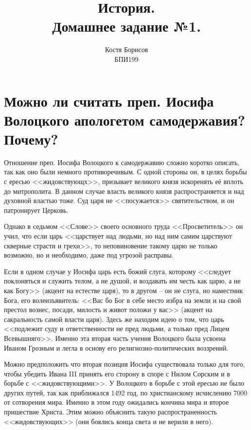 \documentclass[12pt]{article}
\title{История. \\ Домашнее задание №1.}
\author{Костя Борисов \\ БПИ199}
\begin{document}
  \maketitle
  \setcounter{section}{2}

  \section{Можно ли считать преп. Иосифа Волоцкого апологетом\protect\footnotemark{} самодержавия\protect\footnotemark{}? Почему?}
  \addtocounter{footnote}{-2}

  Отношение преп. Иосифа Волоцкого к самодержавию сложно коротко описать, так как оно были немного противоречивым.
  С одной стороны он, в целях борьбы с ересью <<жидовствующх>>, призывает великого князя искоренять её вплоть до митрополита.
  В данном случае власть великого князя распространяется и над духовной властью тоже.
  Суд царя не <<посужается>> святительством, и он патронирует Церковь.

  Однако в седьмом <<Слове>> своего основного труда <<Просветитель>> он учил,
  что если царь <<царствует над людьми, но над ним самим царствуют скверные страсти и грехи>>,
  то неповиновение такому царю не только возможно, но и необходимо, даже под угрозой расправы.

  Если в одном случае у Иосифа царь есть божий слуга,
  которому <<следует поклоняться и служить телом, а не душой, и воздавать им честь как царю, а не как Богу>> (акцент на естестве царя),
  то в другом -- он не слуга, но наместник Бога, его волеизъявитель:
  <<Вас бо Бог в себе место избра на земли и на свой престол вознес, посади, милость и живот положи у вас>>
  (акцент на сакральность самой власти царя).
  Здесь же находим идею о том, что царь <<подлежит суду и ответственности не пред людьми, а только пред Лицем Всевышняго>>.
  Именно эта вторая часть учения Волоцкого была усвоена Иваном Грозным и легла в основу его религиозно-политических воззрений.

  Можно предположить что вторая позиция Иосифа существовала только для того,
  чтобы убедить Ивана III принять его сторону в споре с Нилом Сорским и в борьбе с <<жидовствующими>>.
  У Волоцкого в борьбе с этой ересью не было других путей, так как приближался 1492 год, по христианскому исчислению 7000 от сотворения мира.
  Именно в этом году ожидались кончина мира и второе пришествие Христа.
  Этим можно объяснить такую распространенность <<жидовствующих>> (они боялись конца света и не верили в него).
\end{document}
